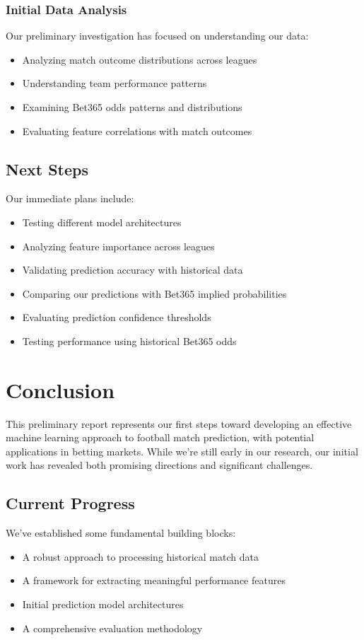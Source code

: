 \documentclass[conference]{IEEEtran}
\begin{document}
\subsubsection{Initial Data Analysis}
Our preliminary investigation has focused on understanding our data:
\begin{itemize}
\item Analyzing match outcome distributions across leagues
\item Understanding team performance patterns
\item Examining Bet365 odds patterns and distributions
\item Evaluating feature correlations with match outcomes
\end{itemize}

\subsection{Next Steps}
Our immediate plans include:
\begin{itemize}
\item Testing different model architectures
\item Analyzing feature importance across leagues
\item Validating prediction accuracy with historical data
\item Comparing our predictions with Bet365 implied probabilities
\item Evaluating prediction confidence thresholds
\item Testing performance using historical Bet365 odds
\end{itemize}

\section{Conclusion}
This preliminary report represents our first steps toward developing an effective machine learning approach to football match prediction, with potential applications in betting markets. While we're still early in our research, our initial work has revealed both promising directions and significant challenges.

\subsection{Current Progress}
We've established some fundamental building blocks:
\begin{itemize}
\item A robust approach to processing historical match data
\item A framework for extracting meaningful performance features
\item Initial prediction model architectures
\item A comprehensive evaluation methodology
\end{itemize}
\end{document}
